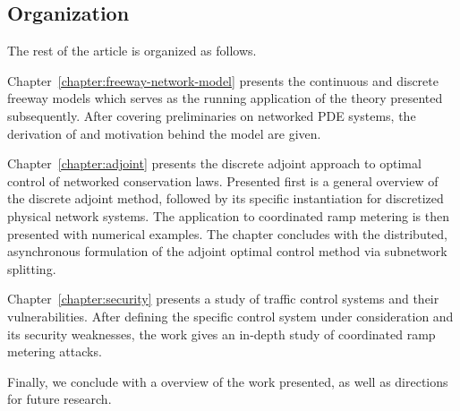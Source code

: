 \subsection{Organization}
\label{sec:organization}

The rest of the article is organized as follows.

Chapter~\ref{chapter:freeway-network-model} presents the continuous and discrete freeway models which serves as the running application of the theory presented subsequently.  After covering preliminaries on networked PDE systems, the derivation of and motivation behind the model are given.

Chapter~\ref{chapter:adjoint} presents the discrete adjoint approach to optimal control of networked conservation laws. Presented first is a general overview of the discrete adjoint method, followed by its specific instantiation for discretized physical network systems. The application to coordinated ramp metering is then presented with numerical examples. The chapter concludes with the distributed, asynchronous formulation of the adjoint optimal control method via subnetwork splitting.

Chapter~\ref{chapter:security} presents a study of traffic control systems and their vulnerabilities. After defining the specific control system under consideration and its security weaknesses, the work gives an in-depth study of coordinated ramp metering attacks.

Finally, we conclude with a overview of the work presented, as well as directions for future research.
